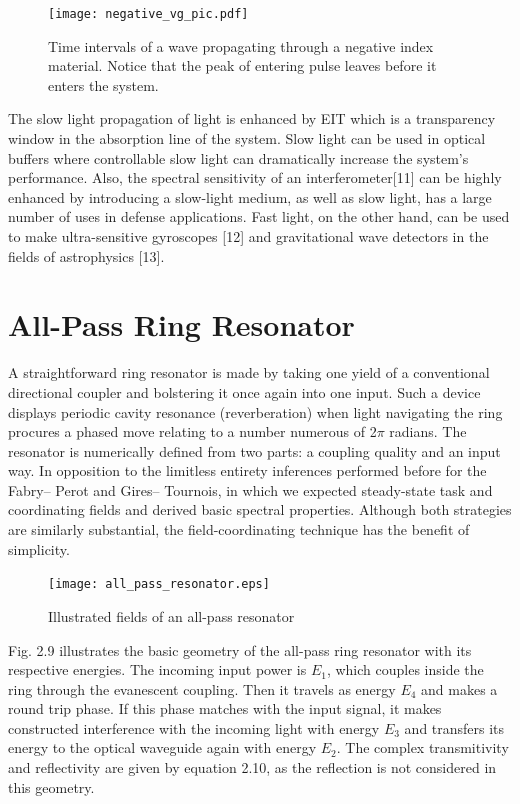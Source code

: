 \begin{figure}[h]
\centering
\texttt{[image: negative\_vg\_pic.pdf]}
\caption{Time intervals of a wave propagating through a negative index material. Notice that the peak of entering pulse leaves before it enters the system.}
\end{figure}

The slow light propagation of light is enhanced by EIT which is a transparency window in the absorption line of the system. Slow light can be used in optical buffers where controllable slow light can dramatically increase the system's performance. Also, the spectral sensitivity of an interferometer[11] can be highly enhanced by introducing a slow-light medium, as well as slow light, has a large number of uses in defense applications. Fast light, on the other hand, can be used to make ultra-sensitive gyroscopes [12] and gravitational wave detectors in the fields of astrophysics [13].



\section{All-Pass Ring Resonator}
A straightforward ring resonator is made by taking one yield of a conventional directional coupler and bolstering it once again into one input. Such a device displays periodic cavity resonance (reverberation) when light navigating the ring procures a phased move relating to a number numerous of 2$\pi$ radians. The resonator is numerically defined from two parts: a coupling quality and an input way. In opposition to the limitless entirety inferences performed before for the Fabry– Perot and Gires– Tournois, in which we expected steady-state task and coordinating fields and derived basic spectral properties. Although both strategies are similarly substantial, the field-coordinating technique has the benefit of simplicity.
\begin{figure}[h]
\centering
\texttt{[image: all\_pass\_resonator.eps]}
\caption{Illustrated fields of an all-pass resonator}
\end{figure}

Fig. 2.9 illustrates the basic geometry of the all-pass ring resonator with its respective energies. The incoming input power is $E_{1}$, which couples inside the ring through the evanescent coupling. Then it travels as energy $E_{4}$ and makes a round trip phase. If this phase matches with the input signal, it makes constructed interference with the incoming light with energy $E_{3}$ and transfers its energy to the optical waveguide again with energy $E_{2}$. The complex transmitivity and reflectivity are given by equation 2.10, as the reflection is not considered in this geometry.
 

